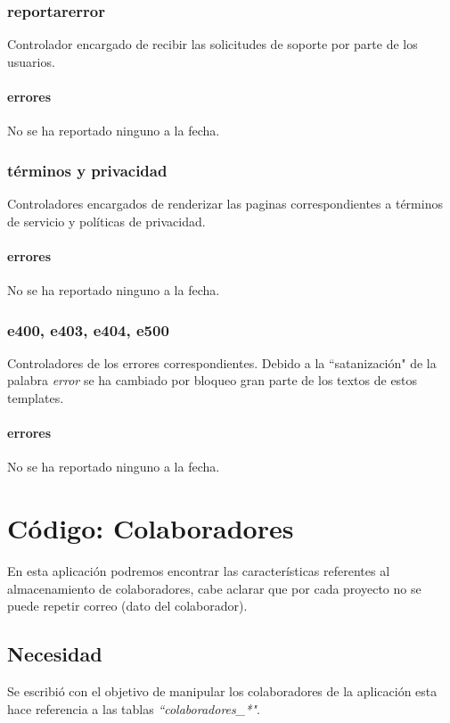 \documentclass[10pt,a4paper]{book}
\begin{document}
	\subsection{reportarerror}
	Controlador encargado de recibir las solicitudes de soporte por parte de los usuarios.
	\subsubsection{errores}
	No se ha reportado ninguno a la fecha.

	\subsection{términos y privacidad}
	Controladores encargados de renderizar las paginas correspondientes a términos de servicio y políticas de privacidad.
	\subsubsection{errores}
	No se ha reportado ninguno a la fecha.

	\subsection{e400, e403, e404, e500}
	Controladores de los errores correspondientes. Debido a la ``satanización" de la palabra \textit{error} se ha cambiado por bloqueo gran parte de los textos de estos templates.
	\subsubsection{errores}
	No se ha reportado ninguno a la fecha.


	\chapter{Código: Colaboradores}

	En esta aplicación podremos encontrar las características referentes al almacenamiento de colaboradores, cabe aclarar que por cada proyecto no se puede repetir correo (dato del colaborador).

	\section{Necesidad}

	Se escribió con el objetivo de manipular los colaboradores de la aplicación esta hace referencia a las tablas \textit{``colaboradores\_*"}.
\end{document}
